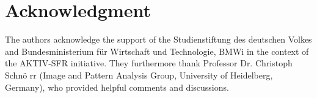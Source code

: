 \documentclass[10pt,letterpaper,journal,compsoc]{IEEEtran}
\begin{document}



\section*{Acknowledgment}
The authors acknowledge the support of the Studienstiftung
des deutschen Volkes and Bundesministerium f\"ur Wirtschaft und
Technologie, BMWi in the context of the AKTIV-SFR
initiative. They furthermore thank Professor Dr. Christoph
Schn\"o rr (Image and Pattern Analysis Group, University of
Heidelberg, Germany), who provided helpful comments
and discussions.
\end{document}
